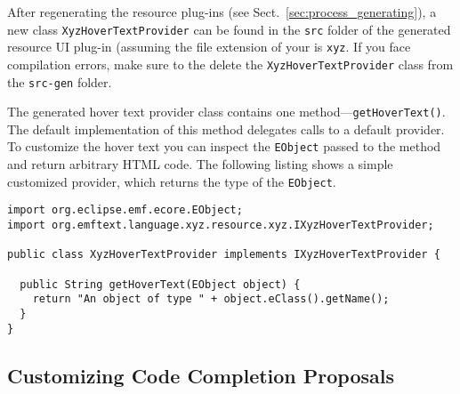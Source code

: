 After regenerating the resource plug-ins (see
Sect.~\ref{sec:process_generating}), a new class
\texttt{XyzHoverTextProvider} can be found in the \texttt{src} folder of the
generated resource UI plug-in (assuming the file extension of your \DSL is \texttt{xyz}.
If you face compilation errors, make sure to the delete the \texttt{XyzHoverTextProvider} 
class from the \texttt{src-gen} folder.

The generated hover text provider class contains one
method---\texttt{getHoverText()}. The default implementation of this
method delegates calls to a default provider. To customize the
hover text you can inspect the \texttt{EObject} passed to the method and return arbitrary HTML code. The
following listing shows a simple customized provider, which returns the type of
the \texttt{EObject}.

\begin{lstlisting}
import org.eclipse.emf.ecore.EObject;
import org.emftext.language.xyz.resource.xyz.IXyzHoverTextProvider;

public class XyzHoverTextProvider implements IXyzHoverTextProvider {
	
  public String getHoverText(EObject object) {
    return "An object of type " + object.eClass().getName();
  }
}
\end{lstlisting}

\subsection{Customizing Code Completion Proposals}

